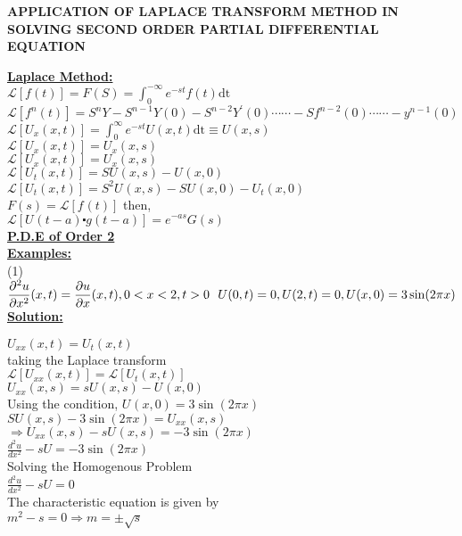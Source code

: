 \documentclass[a4paper 11pt]{article}
\newcommand{\Laplace}{\mathcal{L}}
\newcommand{\ft}{f(t)}
\newcommand{\ftn}[1]{f^{#1}(t)}
\newcommand{\FS}{F(S)}
\newcommand{\LaplaceIntegral}{\int_{0}^{-\infty}e^{-st}\ft\text{dt}}
\newcommand{\sbracket}[1]{\left[#1\right]}
\newcommand{\Yn}[1]{Y^{#1}(0)}
\newcommand{\fn}[1]{f^{#1}(0)}
\newcommand{\Sn}[1]{S^{#1}}
\newcommand{\LUx}[1]{\Laplace\sbracket{U_{#1}(x,t)}}
\newcommand{\Un}[2]{U_{#1}(#2)}
\newcommand{\LInt}{\int_{0}^{\infty}e^{-st}U(x,t)\text{dt}}
\newcommand{\LFt}{\Laplace \sbracket{\ftn{}}}
\newcommand{\NI}{\noindent}
\newcommand{\LFn}[1]{\Laplace \sbracket{#1}}
\begin{document}
\begin{center}
\textbf{APPLICATION OF LAPLACE TRANSFORM METHOD IN SOLVING SECOND ORDER PARTIAL DIFFERENTIAL EQUATION} \\[1.5cm]
\end{center}

\NI \underline{\textbf{Laplace Method:}}\\[0.2cm]

\NI $\Laplace\left[\ft\right] = \FS = \LaplaceIntegral$ \\[0.1cm]
$ \Laplace \sbracket{\ftn{n}}  = S^{n}Y - \Sn{n-1}Y(0) - \Sn{n-2}\Yn{\prime} \cdots\cdots - S\fn{n-2} \cdots\cdots - y^{n-1}(0) $ \\[0.1cm]
$\LUx{x} = \LInt \equiv U(x,s) $\\[0.1cm]
$\LUx{x} = \Un{x}{x,s}$\\[0.1cm]
$\LUx{x} = \Un{x}{x,s}$\\[0.1cm]
$\LUx{t} = S\Un{}{x,s} - \Un{}{x,0}$\\[0.1cm]
$\LUx{t} = S^{2}\Un{}{x,s} - S\Un{}{x,0} - \Un{t}{x,0}$\\[0.1cm]
$F(s) = \LFt $ then,\\[0.2cm]
$\Laplace\sbracket{\Un{}{t-a}\centerdot g(t-a)} = e^{-as}G(s)$\\[.6cm]

\NI \underline{\textbf{P.D.E of Order 2}}\\[0.1cm]

\NI \underline{\textbf{Examples:}}\\[0.2cm]

\NI (1) ${\displaystyle \frac{\partial^{2}u}{\partial x^{2}}(x,t) = \frac{\partial u}{\partial x}(x,t), 0 < x < 2, t > 0  \text{ \text{ }} U(0,t) = 0, U(2,t) = 0, U(x,0) = 3\sin(2\pi x)}$\\

\NI \underline{\textbf{Solution:}}

\NI $\Un{xx}{x,t} = \Un{t}{x,t}$\\[0.2cm]
taking the Laplace transform \\[0.2cm]
$\LFn{\Un{xx}{x,t}} = \LFn{\Un{t}{x,t}}$\\[0.2cm]
$\Un{xx}{x,s} = s\Un{}{x,s} - \Un{}{x,0}$\\[0.7cm]
Using the condition, $\Un{}{x,0} = 3\sin(2\pi x)$ \\[0.2cm]
$S\Un{}{x,s} - 3\sin(2\pi x) = \Un{xx}{x,s}$ \\[0.2cm]
$\Longrightarrow \Un{xx}{x,s} - s\Un{}{x,s} = - 3\sin(2\pi x)$ \\[0.2cm]
${\displaystyle \frac{d^{2}u}{dx^{2}} - sU = - 3\sin(2\pi x)}$\\[0.7cm]
Solving the Homogenous Problem \\[0.2cm]
${\displaystyle \frac{d^{2}u}{dx^{2}} - sU = 0}$\\[0.7cm]
The characteristic equation is given by \\[0.2cm]
$m^2 - s = 0 \Rightarrow m = \pm \sqrt{s}$ \\[0.2cm]
\end{document}
